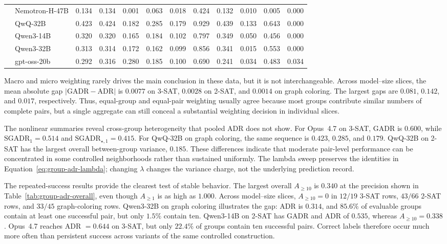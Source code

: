 \documentclass[acmsmall,screen,review,anonymous]{acmart}
\begin{document}
\begin{table}[t]
{\begin{tabular}{llrrrrrrrrrr}
& Nemotron-H-47B & 0.134 & 0.134 & 0.001 & 0.063 & 0.018 & 0.424 & 0.132 & 0.010 & 0.005 & 0.000\\
& QwQ-32B & 0.423 & 0.424 & 0.182 & 0.285 & 0.179 & 0.929 & 0.439 & 0.133 & 0.643 & 0.000\\
& Qwen3-14B & 0.320 & 0.320 & 0.165 & 0.184 & 0.102 & 0.797 & 0.349 & 0.050 & 0.456 & 0.000\\
& Qwen3-32B & 0.313 & 0.314 & 0.172 & 0.162 & 0.099 & 0.856 & 0.341 & 0.015 & 0.553 & 0.000\\
& gpt-oss-20b & 0.292 & 0.316 & 0.280 & 0.185 & 0.100 & 0.690 & 0.241 & 0.034 & 0.483 & 0.034\\
\bottomrule
\end{tabular}%
}
\end{table}

Macro and micro weighting rarely drives the main conclusion in these data,
but it is not interchangeable. Across model--size slices, the mean absolute
gap \(|\mathrm{GADR}-\mathrm{ADR}|\) is \(0.0077\) on 3-SAT, \(0.0028\) on
2-SAT, and \(0.0014\) on graph coloring. The largest gaps are \(0.081\),
\(0.142\), and \(0.017\), respectively. Thus, equal-group and equal-pair
weighting usually agree because most groups contribute similar numbers of
complete pairs, but a single aggregate can still conceal a substantial
weighting decision in individual slices.

The nonlinear summaries reveal cross-group heterogeneity that pooled ADR does
not show. For Opus~4.7 on 3-SAT, GADR is \(0.600\),
while \(\mathrm{SGADR}_{1}=0.514\) and
\(\mathrm{SGADR}_{\star,1}=0.415\). For QwQ-32B on graph coloring, the same
sequence is \(0.423\), \(0.285\), and \(0.179\). QwQ-32B on 2-SAT has the
largest overall between-group variance, \(0.185\). These differences indicate that
moderate pair-level performance can be concentrated in some controlled
neighborhoods rather than sustained uniformly. The lambda sweep preserves
the identities in Equation~\eqref{eq:group-adr-lambda}; changing \(\lambda\)
changes the variance charge, not the underlying prediction record.

The repeated-success results provide the clearest test of stable behavior.
The largest overall \(A_{\ge10}\) is \(0.340\) at the precision shown in
Table~\ref{tab:group-adr-overall}, even though
\(A_{\ge1}\) is as high as \(1.000\). Across model--size slices,
\(A_{\ge10}=0\) in \(12/19\) 3-SAT rows, \(43/66\) 2-SAT rows, and
\(33/45\) graph-coloring rows. Qwen3-32B on graph coloring illustrates the
gap: ADR is \(0.314\), and \(85.6\%\) of evaluable groups contain at least
one successful pair, but only \(1.5\%\) contain ten. Qwen3-14B on 2-SAT has
GADR and ADR of \(0.535\), whereas \(A_{\ge10}=0.338\). Opus~4.7 reaches
ADR \(=0.644\) on 3-SAT, but only \(22.4\%\) of groups contain ten
successful pairs. Correct labels therefore occur much more often than
persistent success across variants of the same controlled construction.
\end{document}
